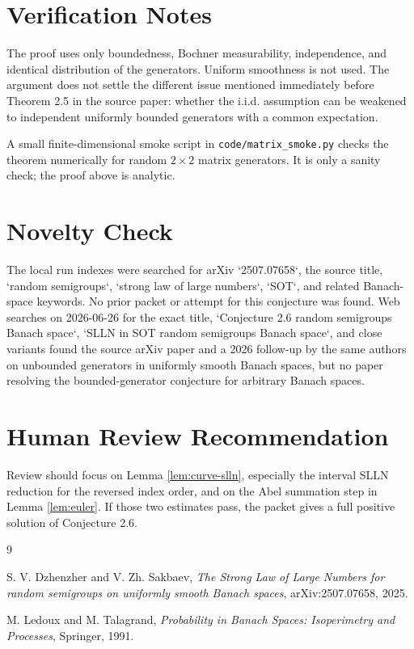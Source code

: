 \documentclass[11pt]{article}
\begin{document}
\section*{Verification Notes}

The proof uses only boundedness, Bochner measurability, independence, and
identical distribution of the generators.  Uniform smoothness is not used.
The argument does not settle the different issue mentioned immediately before
Theorem 2.5 in the source paper: whether the i.i.d. assumption can be weakened
to independent uniformly bounded generators with a common expectation.

A small finite-dimensional smoke script in \texttt{code/matrix\_smoke.py}
checks the theorem numerically for random \(2\times2\) matrix generators.  It
is only a sanity check; the proof above is analytic.

\section*{Novelty Check}

The local run indexes were searched for arXiv `2507.07658`, the source title,
`random semigroups`, `strong law of large numbers`, `SOT`, and related
Banach-space keywords.  No prior packet or attempt for this conjecture was
found.  Web searches on 2026-06-26 for the exact title, `Conjecture 2.6 random
semigroups Banach space`, `SLLN in SOT random semigroups Banach space`, and
close variants found the source arXiv paper and a 2026 follow-up by the same
authors on unbounded generators in uniformly smooth Banach spaces, but no
paper resolving the bounded-generator conjecture for arbitrary Banach spaces.

\section*{Human Review Recommendation}

Review should focus on Lemma \ref{lem:curve-slln}, especially the interval
SLLN reduction for the reversed index order, and on the Abel summation step in
Lemma \ref{lem:euler}.  If those two estimates pass, the packet gives a full
positive solution of Conjecture 2.6.

\begin{thebibliography}{9}

S. V. Dzhenzher and V. Zh. Sakbaev,
\emph{The Strong Law of Large Numbers for random semigroups on uniformly
smooth Banach spaces},
arXiv:2507.07658, 2025.

M. Ledoux and M. Talagrand,
\emph{Probability in Banach Spaces: Isoperimetry and Processes},
Springer, 1991.

\end{thebibliography}
\end{document}

